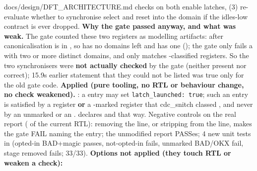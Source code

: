 \begin{relocated}{docs/design/DFT_ARCHITECTURE.md}
checks on both enable latches, (3) re-evaluate whether to synchronise
select and reset into the  domain if the idles-low
contract is ever dropped. \textbf{Why the gate passed anyway, and what
was weak.} The gate counted these two registers as modelling artifacts:
after canonicalisation  is in , so
 has no domains left and  has one
(); the gate only fails a  with two or
more distinct domains, and  only matches
-classified registers. So the two synchronisers were
\textbf{not actually checked} by the gate (neither present nor correct);
15.9\textquotesingle s earlier statement that they could not be listed
was true only for the old gate code. \textbf{Applied (pure tooling, no
RTL or behaviour change, no check weakened).}
: a  entry may
set \texttt{latch\_\allowbreak{}launched:\allowbreak{}\ true}; such an
entry is satisfied by a  register \textbf{or} a
-marked register that cdc\_\allowbreak{}snitch classed
, and never by an unmarked  or an .
 declares  and
 that way. Negative controls on the real report
( of the current RTL): removing the
 line, or stripping  from the 
line, makes the gate FAIL naming the entry; the unmodified report
PASSes; 4 new unit tests in  (opted-in
BAD+magic passes, not-opted-in fails, unmarked BAD/OKX fail, stage
removed fails; 33/33). \textbf{Options not applied (they touch RTL or
weaken a check):}


\end{relocated}
